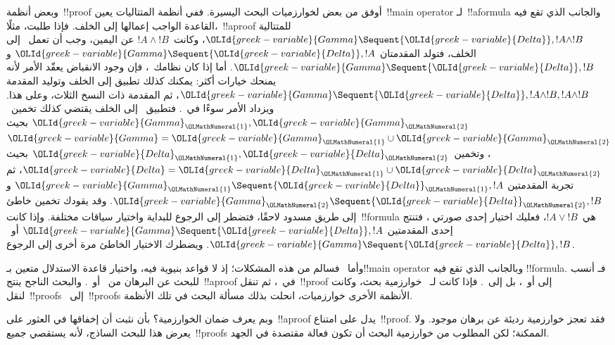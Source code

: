 \documentclass[../../../include/open-logic-section]{subfiles}
\begin{document}
وبعض أنظمة~!!{proof} أوفق من بعض لخوارزميات البحث اليسيرة. ففي أنظمة
المتتاليات يعين~!!{main operator} لـ~!!a{formula} والجانب الذي تقع فيه
القاعدة الواجب إعمالها إلى الخلف. فإذا طلبت، مثلًا،~!!a{proof} للمتتالية
${\OLId{greek-variable}{Gamma}} \Sequent {\OLId{greek-variable}{Delta}},!A\land !B$، وكانت~$!A\land !B$ عن اليمين،
وجب أن تعمل~\RightR{\land} إلى الخلف، فتولد المقدمتان
${\OLId{greek-variable}{Gamma}} \Sequent {\OLId{greek-variable}{Delta}},!A$ و
${\OLId{greek-variable}{Gamma}} \Sequent {\OLId{greek-variable}{Delta}},!B$. أما إذا كان نظامك~، فإن وجود
الانقباض يعقّد الأمر لأنه يمنحك خيارات أكثر: يمكنك كذلك تطبيق
\RightR{\Contraction} إلى الخلف وتوليد المقدمة
${\OLId{greek-variable}{Gamma}} \Sequent {\OLId{greek-variable}{Delta}},!A\land !B,!A\land !B$، ثم المقدمة ذات النسخ
الثلاث، وعلى هذا. ويزداد الأمر سوءًا في~. فتطبيق~\RightR{\land} إلى
الخلف يقتضي كذلك تخمين~${\OLId{greek-variable}{Gamma}}_{\OLMathNumeral{1}},{\OLId{greek-variable}{Gamma}}_{\OLMathNumeral{2}}$ بحيث
${\OLId{greek-variable}{Gamma}}={\OLId{greek-variable}{Gamma}}_{\OLMathNumeral{1}}\cup{\OLId{greek-variable}{Gamma}}_{\OLMathNumeral{2}}$، وتخمين~${\OLId{greek-variable}{Delta}}_{\OLMathNumeral{1}},{\OLId{greek-variable}{Delta}}_{\OLMathNumeral{2}}$ بحيث
${\OLId{greek-variable}{Delta}}={\OLId{greek-variable}{Delta}}_{\OLMathNumeral{1}}\cup{\OLId{greek-variable}{Delta}}_{\OLMathNumeral{2}}$، ثم تجربة المقدمتين
${\OLId{greek-variable}{Gamma}}_{\OLMathNumeral{1}}\Sequent{\OLId{greek-variable}{Delta}}_{\OLMathNumeral{1}},!A$ و${\OLId{greek-variable}{Gamma}}_{\OLMathNumeral{2}}\Sequent{\OLId{greek-variable}{Delta}}_{\OLMathNumeral{2}},!B$. وقد يقودك
تخمين خاطئ إلى طريق مسدود لاحقًا، فتضطر إلى الرجوع للبداية واختيار سياقات
مختلفة. وإذا كانت~!!{formula} هي~$!A\lor !B$، فعليك اختيار إحدى صورتي
\RightR{\lor}، فتنتج إحدى المقدمتين
${\OLId{greek-variable}{Gamma}}\Sequent{\OLId{greek-variable}{Delta}},!A$ أو~${\OLId{greek-variable}{Gamma}}\Sequent{\OLId{greek-variable}{Delta}},!B$. ويضطرك الاختيار
الخاطئ مرة أخرى إلى الرجوع.

وأما~ فسالم من هذه المشكلات؛ إذ لا قواعد بنيوية فيه، واختيار
قاعدة الاستدلال متعين بـ!!{main operator} وبالجانب الذي تقع فيه
!!{formula}. فـ أنسب للبحث عن البرهان من~ أو~.
والبحث الناجح ينتج~!!a{proof} في~، ثم تنقل~!!{proof} إلى
 أو~، بل إلى~. فإذا كانت لـ~
خوارزمية بحث، وكانت لنقل~!!{proof}s~ إلى~!!{proof}s الأنظمة
الأخرى خوارزميات، انحلت بذلك مسألة البحث في تلك الأنظمة.

وبم يعرف ضمان الخوارزمية؟ بأن نثبت أن إخفاقها في العثور على~!!a{proof}
يدل على امتناع~!!{proof}. فقد تعجز خوارزمية رديئة عن برهان موجود. ولا
يعرض هذا للبحث الساذج، لأنه يستقصي جميع~!!{proof}s الممكنة؛ لكن المطلوب
من خوارزمية البحث أن تكون فعالة مقتصدة في الجهد.
\end{document}
